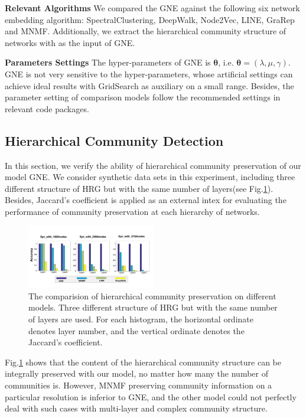 \documentclass{article}
\theoremstyle{definition}
\begin{document}
	\noindent \textbf{Relevant Algorithms}
	We compared the GNE against the following six network embedding algorithm: SpectralClustering\cite{Tang2011Leveraging}, DeepWalk\cite{Perozzi2014DeepWalk}, Node2Vec\cite{Grover2016node2vec}, LINE\cite{Tang2015LINE}, GraRep\cite{Cao2015GraRep} and MNMF\cite{Wang2017Community}. Additionally, we extract the hierarchical community structure of networks with \cite{Tsvetovat2011Social} as the input of GNE.  

	\noindent \textbf{Parameters Settings} 
	The hyper-parameters of GNE is $\bm{\theta}$, i.e. $\bm{\theta}=(\lambda, \mu, \gamma)$. GNE is not very sensitive to the hyper-parameters, whose artificial settings can achieve ideal results with GridSearch as auxiliary on a small range. Besides, the parameter setting of comparison models follow the recommended settings in relevant code packages.

	\subsection{Hierarchical Community Detection}

	In this section, we verify the ability of hierarchical community preservation of our model GNE. We consider synthetic data sets in this experiment, including three different structure of HRG but with the same number of layers(see Fig.\ref{fig:community_preservation}). Besides, Jaccard's coefficient \cite{halkidi2001clustering} is applied as an external intex for evaluating the performance of community preservation at each hierarchy of networks.

	\begin{figure}[H]
		\center
		\includegraphics[width=0.5\textwidth]{figure/community_preservation.pdf}
		\caption{The comparision of hierarchical community preservation on different models. Three different structure of HRG but with the same number of layers are used. For each histogram, the horizontal ordinate denotes layer number, and the vertical ordinate denotes the Jaccard's coefficient.}
		\label{fig:community_preservation}
	\end{figure}
	Fig.\ref{fig:community_preservation} shows that the content of the hierarchical community structure can be integrally preserved with our model, no matter how many the number of communities is. However, MNMF preserving community information on a particular resolution is inferior to GNE, and the other model could not perfectly deal with such cases with multi-layer and complex community structure.
	
\end{document}
